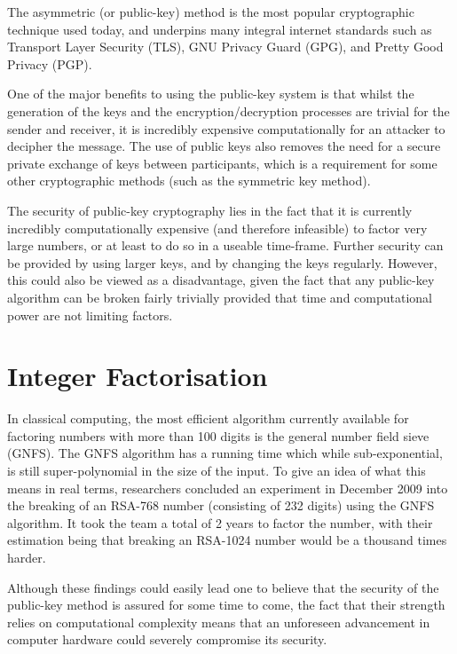\documentclass[runningheads,a4paper]{llncs}
\begin{document}
The asymmetric (or public-key) method is the most popular cryptographic technique used today, and underpins many integral internet standards such as Transport Layer Security (TLS), GNU Privacy Guard (GPG), and Pretty Good Privacy (PGP).

One of the major benefits to using the public-key system is that whilst the generation of the keys and the encryption/decryption processes are trivial for the sender and receiver, it is incredibly expensive computationally for an attacker to decipher the message. The use of public keys also removes the need for a secure private exchange of keys between participants, which is a requirement for some other cryptographic methods (such as the symmetric key method).

The security of public-key cryptography lies in the fact that it is currently incredibly computationally expensive (and therefore infeasible) to factor very large numbers, or at least to do so in a useable time-frame. Further security can be provided by using larger keys, and by changing the keys regularly. However, this could also be viewed as a disadvantage, given the fact that any public-key algorithm can be broken fairly trivially provided that time and computational power are not limiting factors.

\section{Integer Factorisation}

In classical computing, the most efficient algorithm currently available for factoring numbers with more than 100 digits is the general number field sieve (GNFS). The GNFS algorithm has a running time which while sub-exponential, is still super-polynomial in the size of the input. To give an idea of what this means in real terms, researchers concluded an experiment in December 2009 into the breaking of an RSA-768 number (consisting of 232 digits) using the GNFS algorithm. It took the team a total of 2 years to factor the number, with their estimation being that breaking an RSA-1024 number would be a thousand times harder\cite{Kleinjung:2010:FRM:1881412.1881436}. 

Although these findings could easily lead one to believe that the security of the public-key method is assured for some time to come, the fact that their strength relies on computational complexity means that an unforeseen advancement in  computer hardware could severely compromise its security. 
\end{document}
